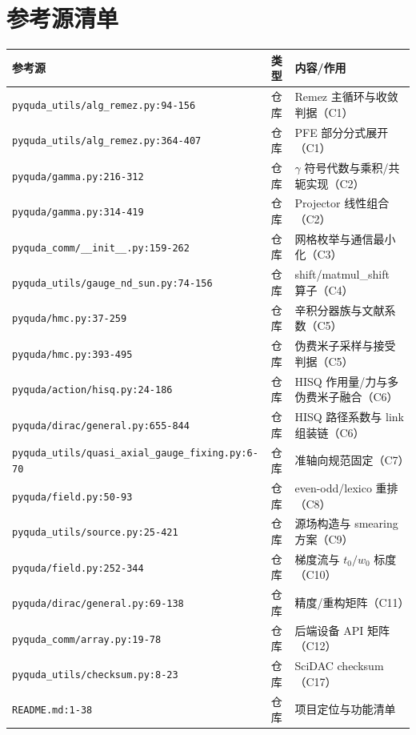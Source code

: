 \documentclass[UTF8]{ctexart}
\begin{document}




\section{参考源清单}

\begin{xltabular}{\textwidth}{llX}
\toprule
\textcolor{evidence}{参考源} & 类型 & 内容/作用 \\
\midrule
\endhead
\texttt{\nolinkurl{pyquda_utils/alg_remez.py:94-156}} & 仓库 & Remez 主循环与收敛判据（C1） \\
\texttt{\nolinkurl{pyquda_utils/alg_remez.py:364-407}} & 仓库 & PFE 部分分式展开（C1） \\
\texttt{\nolinkurl{pyquda/gamma.py:216-312}} & 仓库 & $\gamma$ 符号代数与乘积/共轭实现（C2） \\
\texttt{\nolinkurl{pyquda/gamma.py:314-419}} & 仓库 & Projector 线性组合（C2） \\
\texttt{\nolinkurl{pyquda_comm/__init__.py:159-262}} & 仓库 & 网格枚举与通信最小化（C3） \\
\texttt{\nolinkurl{pyquda_utils/gauge_nd_sun.py:74-156}} & 仓库 & shift/matmul\_shift 算子（C4） \\
\texttt{\nolinkurl{pyquda/hmc.py:37-259}} & 仓库 & 辛积分器族与文献系数（C5） \\
\texttt{\nolinkurl{pyquda/hmc.py:393-495}} & 仓库 & 伪费米子采样与接受判据（C5） \\
\texttt{\nolinkurl{pyquda/action/hisq.py:24-186}} & 仓库 & HISQ 作用量/力与多伪费米子融合（C6） \\
\texttt{\nolinkurl{pyquda/dirac/general.py:655-844}} & 仓库 & HISQ 路径系数与 link 组装链（C6） \\
\texttt{\nolinkurl{pyquda_utils/quasi_axial_gauge_fixing.py:6-70}} & 仓库 & 准轴向规范固定（C7） \\
\texttt{\nolinkurl{pyquda/field.py:50-93}} & 仓库 & even-odd/lexico 重排（C8） \\
\texttt{\nolinkurl{pyquda_utils/source.py:25-421}} & 仓库 & 源场构造与 smearing 方案（C9） \\
\texttt{\nolinkurl{pyquda/field.py:252-344}} & 仓库 & 梯度流与 $t_0/w_0$ 标度（C10） \\
\texttt{\nolinkurl{pyquda/dirac/general.py:69-138}} & 仓库 & 精度/重构矩阵（C11） \\
\texttt{\nolinkurl{pyquda_comm/array.py:19-78}} & 仓库 & 后端设备 API 矩阵（C12） \\
\texttt{\nolinkurl{pyquda_utils/checksum.py:8-23}} & 仓库 & SciDAC checksum（C17） \\
\texttt{\nolinkurl{README.md:1-38}} & 仓库 & 项目定位与功能清单 \\
\bottomrule
\end{xltabular}
\end{document}
